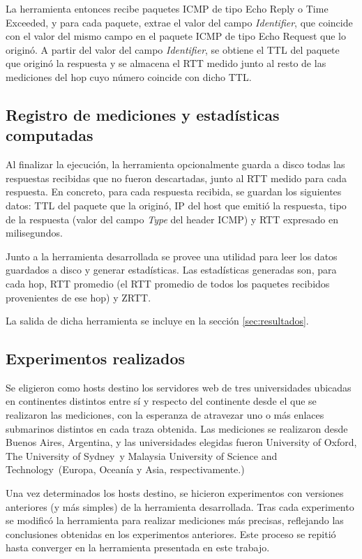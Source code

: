 \documentclass[a4paper, 10pt, twoside]{article}
\newcommand{\oxford}{University of Oxford}
\newcommand{\sydney}{The University of Sydney}
\newcommand{\must}{Malaysia University of Science and Technology}
\begin{document}
La herramienta entonces recibe paquetes ICMP de tipo Echo Reply o Time Exceeded, y para cada paquete, extrae el valor del campo \emph{Identifier}, que coincide con el valor del mismo campo en el paquete ICMP de tipo Echo Request que lo originó. A partir del valor del campo \emph{Identifier}, se obtiene el TTL del paquete que originó la respuesta y se almacena el RTT medido junto al resto de las mediciones del hop cuyo número coincide con dicho TTL.


\subsection{Registro de mediciones y estadísticas computadas}

Al finalizar la ejecución, la herramienta opcionalmente guarda a disco todas las respuestas recibidas que no fueron descartadas, junto al RTT medido para cada respuesta. En concreto, para cada respuesta recibida, se guardan los siguientes datos: TTL del paquete que la originó, IP del host que emitió la respuesta, tipo de la respuesta (valor del campo \emph{Type} del header ICMP) y RTT expresado en milisegundos.

Junto a la herramienta desarrollada se provee una utilidad para leer los datos guardados a disco y generar estadísticas. Las estadísticas generadas son, para cada hop, RTT promedio (el RTT promedio de todos los paquetes recibidos provenientes de ese hop) y ZRTT.

La salida de dicha herramienta se incluye en la sección \ref{sec:resultados}.


\subsection{Experimentos realizados}

Se eligieron como hosts destino los servidores web de tres universidades ubicadas en continentes distintos entre sí y respecto del continente desde el que se realizaron las mediciones, con la esperanza de atravezar uno o más enlaces submarinos distintos en cada traza obtenida. Las mediciones se realizaron desde Buenos Aires, Argentina, y las universidades elegidas fueron \oxford, \sydney\ y \must\ (Europa, Oceanía y Asia, respectivamente.)

Una vez determinados los hosts destino, se hicieron experimentos con versiones anteriores (y más simples) de la herramienta desarrollada. Tras cada experimento se modificó la herramienta para realizar mediciones más precisas, reflejando las conclusiones obtenidas en los experimentos anteriores. Este proceso se repitió hasta converger en la herramienta presentada en este trabajo.
\end{document}
